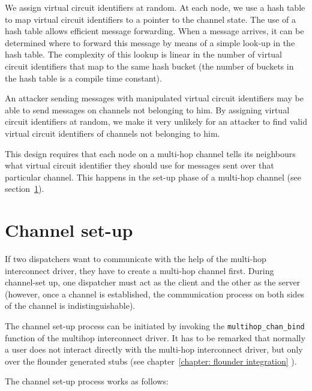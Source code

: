 \documentclass[a4paper,twoside]{report} %
\begin{document}
We assign virtual circuit identifiers at random. At each node, we use a hash table to map virtual circuit identifiers to a pointer to the channel state. The use of a hash table allows efficient message forwarding. When a message arrives, it can be determined where to forward this message by means of a simple look-up in the hash table. The complexity of this lookup is linear in the number of virtual circuit identifiers that map to the same hash bucket (the number of buckets in the hash table is a compile time constant).

An attacker sending messages with manipulated virtual circuit identifiers may be able to send messages on channels not belonging to him. By assigning virtual circuit identifiers at random, we make it very unlikely for an attacker to find valid virtual circuit identifiers of channels not belonging to him.

This design requires that each node on a multi-hop channel tells its neighbours what virtual circuit identifier they should use for messages sent over that particular channel. This happens in the set-up phase of a multi-hop channel (see section~\ref{section: set-up}).



\section{Channel set-up}
\label{section: set-up}
If two dispatchers want to communicate with the help of the multi-hop interconnect driver, they have to create a multi-hop channel first. During channel-set up, one dispatcher must act as the client and the other as the server (however, once a channel is established, the communication process on both sides of the channel is indistinguishable). 

The channel set-up process can be initiated by invoking the \texttt{multihop\_chan\_bind} function of the multihop interconnect driver. It has to be remarked that normally a user does not interact directly with the multi-hop interconnect driver, but only over the flounder generated stubs (see chapter~\ref{chapter: flounder integration} ).


The channel set-up process works as follows:
\end{document}
